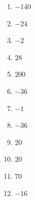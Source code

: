 %
%
    \begin{enumerate}[cols=4]
        \item \(-140\)
        \item \(-24\)
        \item \(-2\)
        \item \(28\)
        \item \(200\)
        \item \(-36\)
        \item \(-1\)
        \item \(-36\)
        \item \(20\)
        \item \(20\)
        \item \(70\)
        \item \(-16\)
    \end{enumerate}
